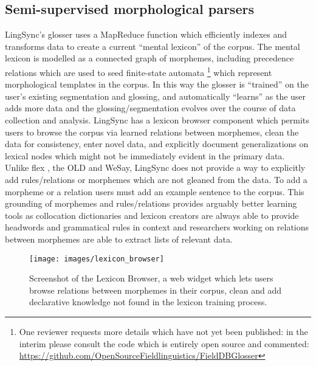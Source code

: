 \documentclass[11pt]{article}
\begin{document}
\subsection{Semi-supervised morphological parsers}
 \label{sec:lingsync-glosser} 

LingSync's glosser uses a MapReduce function which efficiently indexes and transforms data 
 to create a current ``mental lexicon'' of the corpus.  The
mental lexicon is modelled as a connected graph of morphemes, including
precedence relations which are used to seed finite-state automata \cite{Cook:2009}%
\footnote{One reviewer requests more details which have not yet been published:
    in the interim please consult the code which is entirely open source and
    commented:  \\
\url{https://github.com/OpenSourceFieldlinguistics/FieldDBGlosser}} %
which represent morphological templates in the corpus. In this way the glosser
is ``trained'' on the user's existing segmentation and glossing, and
automatically ``learns'' as the user adds more data and the
glossing/segmentation evolves over the course of data collection and analysis. 
LingSync has a lexicon browser component which permits users to browse the
corpus via learned  relations between morphemes, clean the data for
consistency, enter novel data, and explicitly document generalizations on
lexical nodes which might not be immediately evident in the primary data. 
Unlike \gls{flex} \cite{Black:2006}, the OLD and WeSay, LingSync does not
provide a way to explicitly add rules/relations or morphemes which are not
gleaned from the data. To add a morpheme or a relation users must add an
example sentence to the corpus. This grounding of morphemes and rules/relations
provides arguably better learning tools as collocation dictionaries and
lexicon creators are always able to provide headwords and grammatical rules in
context and researchers working on relations between morphemes are able to
extract lists of relevant data.

\begin{figure}
\begin{center}
\texttt{[image: images/lexicon\_browser]}
\caption{Screenshot of the Lexicon Browser, a web widget which lets users
browse relations between morphemes in their corpus, clean and add
declarative knowledge not found in the lexicon training process.}
\label{lexicon_browser_screenshot}
\end{center}
\end{figure}
\end{document}
